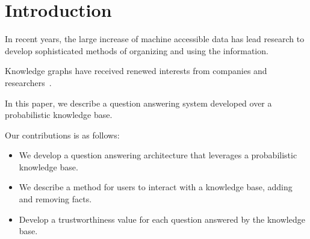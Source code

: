 

\section{Introduction}


In recent years, the large increase of machine accessible data has lead research
to develop sophisticated methods of organizing and using the information.

Knowledge graphs have received renewed interests from companies and
researchers~\cite{dong2014knowledge,chang2014typed,bellare2013woo,niu2012deepdive}.

In this paper, we describe a question answering system developed over a probabilistic 
knowledge base.

Our contributions is as follows:
\begin{itemize}
\item We develop a question answering architecture that leverages a probabilistic knowledge base.
\item We describe a method for users to interact with a knowledge base, adding and removing facts.
\item Develop a trustworthiness value for each question answered by the knowledge base.
\end{itemize}
